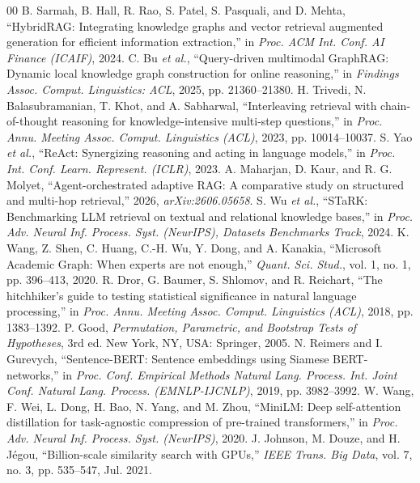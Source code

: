 \documentclass[conference]{IEEEtran}
\begin{document}
\begin{thebibliography}{00}
 B. Sarmah, B. Hall, R. Rao, S. Patel, S. Pasquali, and D. Mehta, ``HybridRAG: Integrating knowledge graphs and vector retrieval augmented generation for efficient information extraction,'' in \emph{Proc. ACM Int. Conf. AI Finance (ICAIF)}, 2024.
 C. Bu \emph{et al.}, ``Query-driven multimodal GraphRAG: Dynamic local knowledge graph construction for online reasoning,'' in \emph{Findings Assoc. Comput. Linguistics: ACL}, 2025, pp. 21360--21380.
 H. Trivedi, N. Balasubramanian, T. Khot, and A. Sabharwal, ``Interleaving retrieval with chain-of-thought reasoning for knowledge-intensive multi-step questions,'' in \emph{Proc. Annu. Meeting Assoc. Comput. Linguistics (ACL)}, 2023, pp. 10014--10037.
 S. Yao \emph{et al.}, ``ReAct: Synergizing reasoning and acting in language models,'' in \emph{Proc. Int. Conf. Learn. Represent. (ICLR)}, 2023.
 A. Maharjan, D. Kaur, and R. G. Molyet, ``Agent-orchestrated adaptive RAG: A comparative study on structured and multi-hop retrieval,'' 2026, \emph{arXiv:2606.05658}.
 S. Wu \emph{et al.}, ``STaRK: Benchmarking LLM retrieval on textual and relational knowledge bases,'' in \emph{Proc. Adv. Neural Inf. Process. Syst. (NeurIPS), Datasets Benchmarks Track}, 2024.
 K. Wang, Z. Shen, C. Huang, C.-H. Wu, Y. Dong, and A. Kanakia, ``Microsoft Academic Graph: When experts are not enough,'' \emph{Quant. Sci. Stud.}, vol. 1, no. 1, pp. 396--413, 2020.
 R. Dror, G. Baumer, S. Shlomov, and R. Reichart, ``The hitchhiker's guide to testing statistical significance in natural language processing,'' in \emph{Proc. Annu. Meeting Assoc. Comput. Linguistics (ACL)}, 2018, pp. 1383--1392.
 P. Good, \emph{Permutation, Parametric, and Bootstrap Tests of Hypotheses}, 3rd ed. New York, NY, USA: Springer, 2005.
 N. Reimers and I. Gurevych, ``Sentence-BERT: Sentence embeddings using Siamese BERT-networks,'' in \emph{Proc. Conf. Empirical Methods Natural Lang. Process. Int. Joint Conf. Natural Lang. Process. (EMNLP-IJCNLP)}, 2019, pp. 3982--3992.
 W. Wang, F. Wei, L. Dong, H. Bao, N. Yang, and M. Zhou, ``MiniLM: Deep self-attention distillation for task-agnostic compression of pre-trained transformers,'' in \emph{Proc. Adv. Neural Inf. Process. Syst. (NeurIPS)}, 2020.
 J. Johnson, M. Douze, and H. Jégou, ``Billion-scale similarity search with GPUs,'' \emph{IEEE Trans. Big Data}, vol. 7, no. 3, pp. 535--547, Jul. 2021.

\end{thebibliography}
\end{document}

